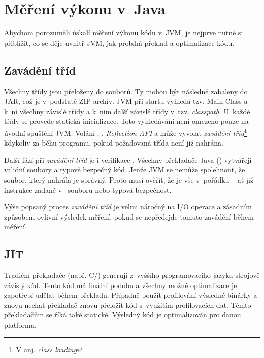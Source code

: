 \section{Měření výkonu v~Java\label{sec:vykonvjava}}

Abychom porozuměli úskalí měření výkonu kódu v~JVM, je nejprve nutné si přiblížit, co se děje uvnitř JVM, jak probíhá překlad a optimalizace kódu.

\subsection{Zavádění tříd}

Všechny třídy jsou přeloženy do \classfile{} souborů. Ty mohou být následně zabaleny do JAR, což je v~podstatě ZIP archív. JVM při startu vyhledá tzv. Main-Class a k~ní všechny závislé třídy a k~nim další závislé třídy v~tzv. \emph{classpath}. U~každé třídy se provede statická inicializace. Toto vyhledávání není omezeno pouze na úvodní spuštění JVM. Volání , , \emph{Reflection API} a  může vyvolat \emph{zavádění tříd}\footnote{V anj. \emph{class loading}} kdykoliv za běhu programu, pokud požadovaná třída není již nahrána\cite{gosling2013java}\cite{lindholm2013java}.

Další fází při \emph{zavádění tříd} je i verifikace \bytecode{}. Všechny překladače Java (\javac{}) vytvářejí validní \classfile{} soubory a typově bezpečný kód. Jenže JVM se nemůže spolehnout, že soubor, který nahrála je správný. Proto musí ověřit, že je vše v~pořádku -- ať již instrukce zadané v~\classfile{} souboru nebo typová bezpečnost.

Výše popsaný proces \emph{zavádění tříd} je velmi náročný na I/O operace a zásadním způsobem ovlivní výsledek měření, pokud se nepředejde tomuto zavádění během měření.

\subsection{JIT\label{sub:JIT}}
Tradiční překladače (např. C/\CC) generují z~vyššího programovacího jazyka strojově závislý kód. Tento kód má finální podobu a všechny možné optimalizace je zapotřebí udělat během překladu. Případně použít profilování výsledné binárky a znovu nechat překladač znovu přeložit kód s~využitím profilovacích dat. Těmto překladačům se říká také statické. Výsledný kód je optimalizován pro danou platformu.

